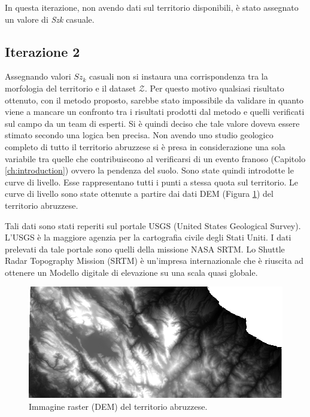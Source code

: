 In questa iterazione, non avendo dati sul territorio disponibili, è stato assegnato un valore di \textit{Szk} casuale. 

\subsection{\textbf{Iterazione 2}}
Assegnando valori $Sz_k$ casuali non si instaura una corrispondenza tra la morfologia del territorio e il dataset $\mathcal{Z}$. Per questo motivo qualsiasi risultato ottenuto, con il metodo proposto, sarebbe stato impossibile da validare in quanto viene a mancare un confronto tra i risultati prodotti dal metodo e quelli verificati sul campo da un team di esperti.    
Si è quindi deciso che tale valore doveva essere stimato secondo una logica ben precisa.
Non avendo uno studio geologico completo di tutto il territorio abruzzese si è presa in  considerazione una sola variabile tra quelle che contribuiscono al verificarsi di un evento franoso (Capitolo \ref{ch:introduction}) ovvero la pendenza del suolo. 
Sono state quindi introdotte le curve di livello. Esse rappresentano tutti i punti a stessa quota sul territorio. Le curve di livello  sono state ottenute a partire dai dati DEM (Figura \ref{fig:raster_abruzzo}) del territorio abruzzese.

Tali dati sono stati reperiti sul portale USGS (United States Geological Survey). L'USGS è la maggiore agenzia per la cartografia civile degli Stati Uniti. I dati prelevati da tale portale sono quelli della missione NASA SRTM.
Lo Shuttle Radar Topography Mission (SRTM) è un'impresa internazionale che è riuscita ad ottenere un Modello digitale di elevazione su una scala quasi globale. 

\begin{figure}[h]
	\centering
	\includegraphics[width=1\textwidth]{images/STRM.PNG}
	\caption{Immagine raster (DEM) del territorio abruzzese.}
	\label{fig:raster_abruzzo}
\end{figure}

